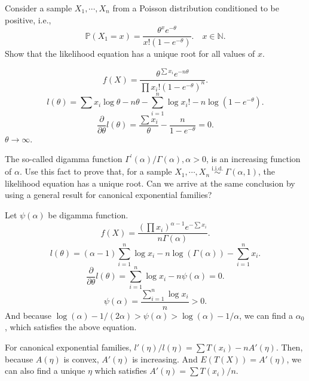 \begin{ex}
    Consider a sample \(X_{1}, \cdots, X_{n}\) from a Poisson distribution conditioned to be positive, i.e.,
    \[
        \mathbb{P}\left(X_{1}=x\right)=\frac{\theta^{x} e^{-\theta}}{x !\left(1-e^{-\theta}\right)} . \quad x \in \mathbb{N} .
    \]
    Show that the likelihood equation has a unique root for all values of \(x\). 
\end{ex}

\begin{solution}
    \[
        f(X)=\frac{\theta^{\sum x_i} e^{-n\theta}}{\prod x_i! (1-e^{-\theta})^n}. 
    \]
    \[
        l(\theta)=\sum x_i \log \theta-n\theta-\sum_{i=1}^n\log x_i!-n\log (1-e^{-\theta}). 
    \]
    \[
        \frac{\partial}{\partial\theta}l(\theta)=\frac{\sum x_i}{\theta}-\frac{n}{1-e^{-\theta}}=0. 
    \]
    $\theta\to \infty$. 
\end{solution}

\begin{ex}
    The so-called digamma function \(\Gamma^{\prime}(\alpha) / \Gamma(\alpha), \alpha>0\), is an increasing function of \(\alpha\). Use this fact to prove that, for a sample \(X_{1}, \cdots, X_{n} \stackrel{\text { i.i.d. }}{\sim} \Gamma(\alpha, 1)\), the likelihood equation has a unique root. Can we arrive at the same conclusion by using a general result for canonical exponential families?
\end{ex}

\begin{solution}
    Let $\psi(\alpha)$ be digamma function. 
    \[
        f(X)=\frac{(\prod x_i)^{\alpha-1}e^{-\sum x_i}}{n\Gamma(\alpha)}. 
    \]
    \[
        l(\theta)=(\alpha-1)\sum_{i=1}^n \log x_i-n\log (\Gamma(\alpha))-\sum_{i=1}^n x_i. 
    \]
    \[
        \frac{\partial}{\partial\theta}l(\theta)=\sum_{i=1}^n\log x_i-n\psi(\alpha)=0. 
    \]
    \[
        \psi(\alpha)=\frac{\sum_{i=1}^n \log x_i}{n}>0. 
    \]
    And because $\log (\alpha)-1/(2\alpha)>\psi(\alpha)>\log (\alpha)-1/\alpha$, we can find a $\alpha_0$, which satisfies the above equation. 

    \noindent For canonical exponential families, $l'(\eta)/l(\eta)=\sum T(x_i)-nA'(\eta)$. Then, because $A(\eta)$ is convex, $A'(\eta)$ is increasing. And $E(T(X))=A'(\eta)$, we can also find a unique $\eta$ which satisfies $A'(\eta)=\sum T(x_i)/n$. 
\end{solution}

